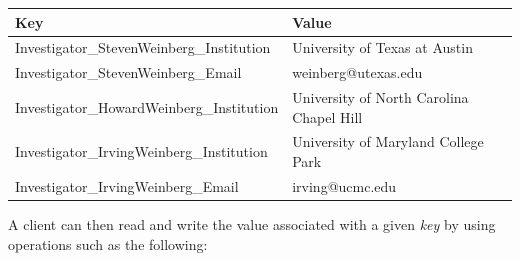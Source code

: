\documentclass[]{krantz}
\begin{document}
\begin{longtable}[]{@{}ll@{}}
\toprule
\begin{minipage}[b]{0.14\columnwidth}\raggedright\strut
\textbf{Key}\strut
\end{minipage} & \begin{minipage}[b]{0.14\columnwidth}\raggedright\strut
\textbf{Value}\strut
\end{minipage}\tabularnewline
\midrule
\endhead
\begin{minipage}[t]{0.14\columnwidth}\raggedright\strut
Investigator\_StevenWeinberg\_Institution\strut
\end{minipage} & \begin{minipage}[t]{0.14\columnwidth}\raggedright\strut
University of Texas at Austin\strut
\end{minipage}\tabularnewline
\begin{minipage}[t]{0.14\columnwidth}\raggedright\strut
Investigator\_StevenWeinberg\_Email\strut
\end{minipage} & \begin{minipage}[t]{0.14\columnwidth}\raggedright\strut
weinberg@utexas.edu\strut
\end{minipage}\tabularnewline
\begin{minipage}[t]{0.14\columnwidth}\raggedright\strut
Investigator\_HowardWeinberg\_Institution\strut
\end{minipage} & \begin{minipage}[t]{0.14\columnwidth}\raggedright\strut
University of North Carolina Chapel Hill\strut
\end{minipage}\tabularnewline
\begin{minipage}[t]{0.14\columnwidth}\raggedright\strut
Investigator\_IrvingWeinberg\_Institution\strut
\end{minipage} & \begin{minipage}[t]{0.14\columnwidth}\raggedright\strut
University of Maryland College Park\strut
\end{minipage}\tabularnewline
\begin{minipage}[t]{0.14\columnwidth}\raggedright\strut
Investigator\_IrvingWeinberg\_Email\strut
\end{minipage} & \begin{minipage}[t]{0.14\columnwidth}\raggedright\strut
irving@ucmc.edu\strut
\end{minipage}\tabularnewline
\bottomrule
\end{longtable}

A client can then read and write the value associated with a given
\emph{key} by using operations such as the following:
\end{document}
